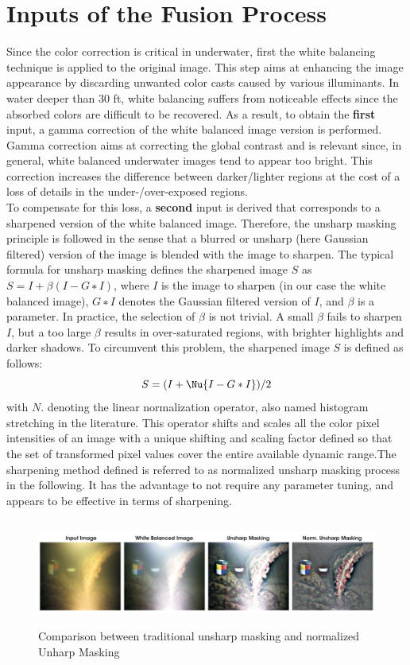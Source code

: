 \documentclass[hidelinks, 12pt]{report}
\begin{document}
\section{Inputs of the Fusion Process}
Since the color correction is critical in underwater, first the white balancing technique is applied to the original image. This step aims at enhancing the image appearance by discarding unwanted color casts caused by various illuminants. In water deeper than 30 ft, white balancing suffers from noticeable effects since the absorbed colors are difficult to be recovered. As a result, to obtain the \textbf{first} input, a gamma correction of the white balanced image version is performed. Gamma correction aims at correcting the global contrast and is relevant since, in general, white balanced underwater images tend to appear too bright. This correction increases the difference between darker/lighter regions at the cost of a loss of details in the under-/over-exposed regions.\\ To compensate for this loss, a \textbf{second} input is derived that corresponds to a sharpened version of the white balanced image. Therefore, the unsharp masking principle is followed in the sense that a blurred or unsharp (here Gaussian filtered) version of the image is blended with the image to sharpen. The typical formula for unsharp masking defines the sharpened image $S$ as $S=I+\beta(I−G∗I)$, where $I$ is the image to sharpen (in our case the white balanced image), $G∗I$ denotes the Gaussian filtered version of $I$, and $\beta$ is a parameter. In practice, the selection of $\beta$ is not trivial. A small $\beta$ fails to sharpen $I$, but a too large $\beta$ results in over-saturated regions, with brighter highlights and darker shadows. To circumvent this problem, the sharpened image $S$ is defined as follows:
\begin{equation}
S=(I+\Nu{I-G*I})/2
\end{equation}
with $N{.}$ denoting the linear normalization operator, also named histogram stretching in the literature. This operator shifts and scales all the color pixel intensities of an image with a unique shifting and scaling factor defined so that the set of transformed pixel values cover the entire available dynamic range.The sharpening method defined is referred to as normalized unsharp masking process in the following. It has the advantage to not require any parameter tuning, and appears to be effective in terms of sharpening. 
\begin{figure}[H]
\centering
\includegraphics[width=15cm,height=3.5cm]{NUM.png}
\caption[Comparison between traditional Unsharp Masking and normalized Unharp Masking]{Comparison between traditional unsharp masking and normalized Unharp Masking}
\label{Comparison between traditional Unsharp Masking and normalized Unharp Masking}
\end{figure}
\end{document}
